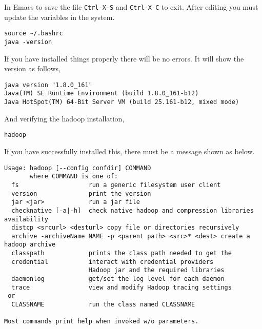 In Emacs to save the file \verb|Ctrl-X-S| and \verb|Ctrl-X-C| to exit. After editing
you must update the variables in the system.

\begin{lstlisting}
source ~/.bashrc
java -version
\end{lstlisting}

If you have installed things properly there will be no errors. It will
show the version as follows,

\begin{lstlisting}
java version "1.8.0_161"
Java(TM) SE Runtime Environment (build 1.8.0_161-b12)
Java HotSpot(TM) 64-Bit Server VM (build 25.161-b12, mixed mode)
\end{lstlisting}

And verifying the hadoop installation,

\begin{lstlisting}
hadoop
\end{lstlisting}

If you have successfully installed this, there must be a message shown
as below.

\begin{lstlisting}
Usage: hadoop [--config confdir] COMMAND
       where COMMAND is one of:
  fs                   run a generic filesystem user client
  version              print the version
  jar <jar>            run a jar file
  checknative [-a|-h]  check native hadoop and compression libraries availability
  distcp <srcurl> <desturl> copy file or directories recursively
  archive -archiveName NAME -p <parent path> <src>* <dest> create a hadoop archive
  classpath            prints the class path needed to get the
  credential           interact with credential providers
                       Hadoop jar and the required libraries
  daemonlog            get/set the log level for each daemon
  trace                view and modify Hadoop tracing settings
 or
  CLASSNAME            run the class named CLASSNAME

Most commands print help when invoked w/o parameters.
\end{lstlisting}
